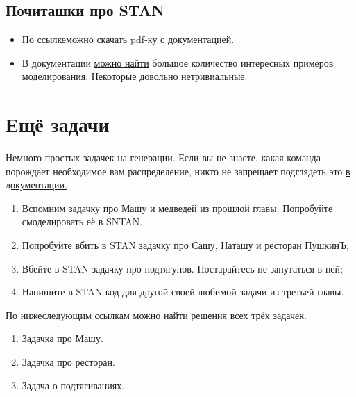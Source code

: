 

 \subsection{Почиташки про STAN}
 
 
 \begin{itemize}
 	\item \href{https://github.com/stan-dev/stan/releases/download/v2.16.0/stan-reference-2.16.0.pdf}{По ссылке}можно скачать pdf-ку с документацией. 
 	
 	
 	\item  В документации \href{http://mc-stan.org/users/documentation/case-studies.html}{можно найти} большое количество интересных примеров моделирования. Некоторые довольно нетривиальные. 
 \end{itemize}



\section{Ещё задачи}

\begin{problem}
	Немного простых задачек на генерации. Если вы не знаете, какая команда порождает необходимое вам распределение, никто не запрещает подглядеть это \href{https://github.com/stan-dev/stan/releases/download/v2.16.0/stan-reference-2.16.0.pdf}{в документации.} 
	\begin{enumerate}
		\item  Вспомним задачку про Машу и медведей из прошлой главы.  Попробуйте смоделировать её в SNTAN. 
		\item  Попробуйте вбить в STAN задачку про Сашу, Наташу и ресторан ПушкинЪ;
		\item  Вбейте в STAN задачку про подтягунов. Постарайтесь не запутаться в ней; 
		\item  Напишите в STAN код для другой своей любимой задачи из третьей главы. 
	\end{enumerate}

    \begin{sol}
	 По нижеследующим ссылкам можно найти решения всех трёх задачек. 
	 	\begin{enumerate}
	 	\item  Задачка про Машу. 
	 	\item  Задачка про ресторан. 
	 	\item  Задача о подтягиваниях. 
	 \end{enumerate}	
	\end{sol}
\end{problem}


